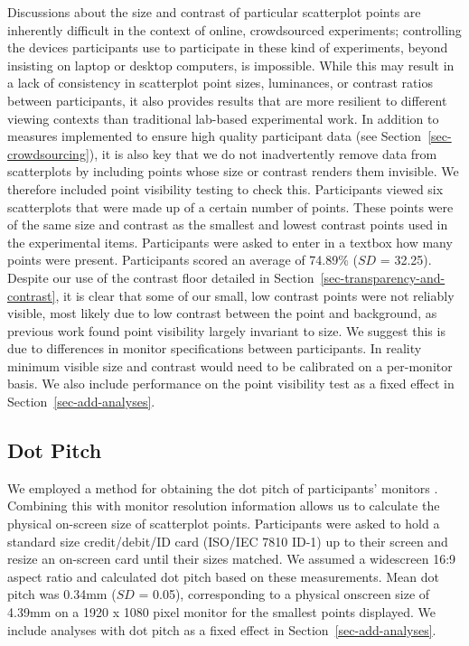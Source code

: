 \documentclass[manuscript, anonymous, screen]{acmart}
\begin{document}
Discussions about the size and contrast of particular scatterplot points
are inherently difficult in the context of online, crowdsourced
experiments; controlling the devices participants use to participate in
these kind of experiments, beyond insisting on laptop or desktop
computers, is impossible. While this may result in a lack of consistency
in scatterplot point sizes, luminances, or contrast ratios between
participants, it also provides results that are more resilient to
different viewing contexts than traditional lab-based experimental work.
In addition to measures implemented to ensure high quality participant
data (see Section~\ref{sec-crowdsourcing}), it is also key that we do
not inadvertently remove data from scatterplots by including points
whose size or contrast renders them invisible. We therefore included
point visibility testing to check this. Participants viewed six
scatterplots that were made up of a certain number of points. These
points were of the same size and contrast as the smallest and lowest
contrast points used in the experimental items. Participants were asked
to enter in a textbox how many points were present. Participants scored
an average of 74.89\% (\(SD\) = 32.25). Despite our use of the contrast
floor detailed in Section~\ref{sec-transparency-and-contrast}, it is
clear that some of our small, low contrast points were not reliably
visible, most likely due to low contrast between the point and
background, as previous work \citep{strain_2023b} found point visibility
largely invariant to size. We suggest this is due to differences in
monitor specifications between participants. In reality minimum visible
size and contrast would need to be calibrated on a per-monitor basis. We
also include performance on the point visibility test as a fixed effect
in Section~\ref{sec-add-analyses}.

\hypertarget{sec-dot-pitch}{%
\subsection{Dot Pitch}\label{sec-dot-pitch}}

We employed a method for obtaining the dot pitch of participants'
monitors \citep{screenscale}. Combining this with monitor resolution
information allows us to calculate the physical on-screen size of
scatterplot points. Participants were asked to hold a standard size
credit/debit/ID card (ISO/IEC 7810 ID-1) up to their screen and resize
an on-screen card until their sizes matched. We assumed a widescreen
16:9 aspect ratio and calculated dot pitch based on these measurements.
Mean dot pitch was 0.34mm (\(SD\) = 0.05), corresponding to a physical
onscreen size of 4.39mm on a 1920 x 1080 pixel monitor for the smallest
points displayed. We include analyses with dot pitch as a fixed effect
in Section~\ref{sec-add-analyses}.
\end{document}
